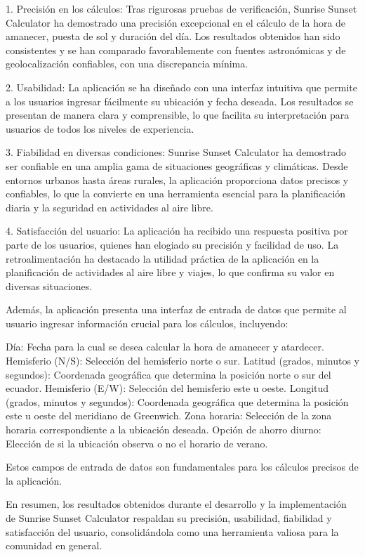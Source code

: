\documentclass[conference]{IEEEtran}
\begin{document}
1. Precisión en los cálculos: Tras rigurosas pruebas de verificación, Sunrise Sunset Calculator ha demostrado una precisión excepcional en el cálculo de la hora de amanecer, puesta de sol y duración del día. Los resultados obtenidos han sido consistentes y se han comparado favorablemente con fuentes astronómicas y de geolocalización confiables, con una discrepancia mínima.

2. Usabilidad: La aplicación se ha diseñado con una interfaz intuitiva que permite a los usuarios ingresar fácilmente su ubicación y fecha deseada. Los resultados se presentan de manera clara y comprensible, lo que facilita su interpretación para usuarios de todos los niveles de experiencia.

3. Fiabilidad en diversas condiciones: Sunrise Sunset Calculator ha demostrado ser confiable en una amplia gama de situaciones geográficas y climáticas. Desde entornos urbanos hasta áreas rurales, la aplicación proporciona datos precisos y confiables, lo que la convierte en una herramienta esencial para la planificación diaria y la seguridad en actividades al aire libre.

4. Satisfacción del usuario: La aplicación ha recibido una respuesta positiva por parte de los usuarios, quienes han elogiado su precisión y facilidad de uso. La retroalimentación ha destacado la utilidad práctica de la aplicación en la planificación de actividades al aire libre y viajes, lo que confirma su valor en diversas situaciones.

Además, la aplicación presenta una interfaz de entrada de datos que permite al usuario ingresar información crucial para los cálculos, incluyendo:

Día: Fecha para la cual se desea calcular la hora de amanecer y atardecer.
Hemisferio (N/S): Selección del hemisferio norte o sur.
Latitud (grados, minutos y segundos): Coordenada geográfica que determina la posición norte o sur del ecuador.
Hemisferio (E/W): Selección del hemisferio este u oeste.
Longitud (grados, minutos y segundos): Coordenada geográfica que determina la posición este u oeste del meridiano de Greenwich.
Zona horaria: Selección de la zona horaria correspondiente a la ubicación deseada.
Opción de ahorro diurno: Elección de si la ubicación observa o no el horario de verano.

Estos campos de entrada de datos son fundamentales para los cálculos precisos de la aplicación.

En resumen, los resultados obtenidos durante el desarrollo y la implementación de Sunrise Sunset Calculator respaldan su precisión, usabilidad, fiabilidad y satisfacción del usuario, consolidándola como una herramienta valiosa para la comunidad en general.
\end{document}

